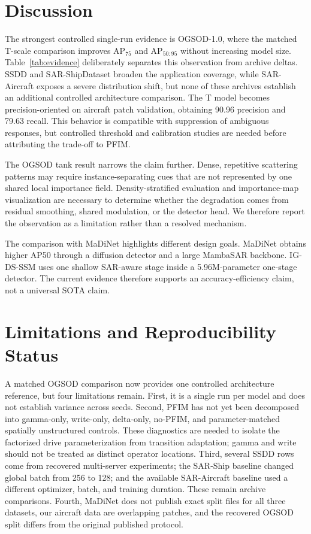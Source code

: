 \documentclass[letterpaper]{article}
\newcommand{\method}{IG-DS-SSM}
\begin{document}
\FloatBarrier
\section{Discussion}

The strongest controlled single-run evidence is OGSOD-1.0, where the matched T-scale comparison improves AP$_{75}$ and AP$_{50:95}$ without increasing model size. Table~\ref{tab:evidence} deliberately separates this observation from archive deltas. SSDD and SAR-ShipDataset broaden the application coverage, while SAR-Aircraft exposes a severe distribution shift, but none of these archives establish an additional controlled architecture comparison. The T model becomes precision-oriented on aircraft patch validation, obtaining 90.96 precision and 79.63 recall. This behavior is compatible with suppression of ambiguous responses, but controlled threshold and calibration studies are needed before attributing the trade-off to PFIM.

The OGSOD tank result narrows the claim further. Dense, repetitive scattering patterns may require instance-separating cues that are not represented by one shared local importance field. Density-stratified evaluation and importance-map visualization are necessary to determine whether the degradation comes from residual smoothing, shared modulation, or the detector head. We therefore report the observation as a limitation rather than a resolved mechanism.

The comparison with MaDiNet highlights different design goals. MaDiNet obtains higher AP50 through a diffusion detector and a large MambaSAR backbone. \method{} uses one shallow SAR-aware stage inside a 5.96M-parameter one-stage detector. The current evidence therefore supports an accuracy-efficiency claim, not a universal SOTA claim.

\section{Limitations and Reproducibility Status}

A matched OGSOD comparison now provides one controlled architecture reference, but four limitations remain. First, it is a single run per model and does not establish variance across seeds. Second, PFIM has not yet been decomposed into gamma-only, write-only, delta-only, no-PFIM, and parameter-matched spatially unstructured controls. These diagnostics are needed to isolate the factorized drive parameterization from transition adaptation; gamma and write should not be treated as distinct operator locations. Third, several SSDD rows come from recovered multi-server experiments; the SAR-Ship baseline changed global batch from 256 to 128; and the available SAR-Aircraft baseline used a different optimizer, batch, and training duration. These remain archive comparisons. Fourth, MaDiNet does not publish exact split files for all three datasets, our aircraft data are overlapping patches, and the recovered OGSOD split differs from the original published protocol.
\end{document}
